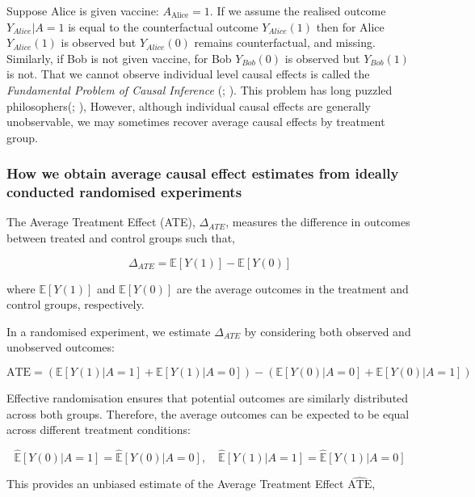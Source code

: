 \documentclass[
  single column]{article}
\begin{document}
Suppose Alice is given vaccine: \(A_{\text{Alice}} = 1\). If we assume
the realised outcome \(Y_{Alice}| A = 1\) is equal to the counterfactual
outcome \(Y_{Alice}(1)\) then for Alice \(Y_{Alice}(1)\) is observed but
\(Y_{Alice}(0)\) remains counterfactual, and missing. Similarly, if Bob
is not given vaccine, for Bob \(Y_{Bob}(0)\) is observed but
\(Y_{Bob}(1)\) is not. That we cannot observe individual level causal
effects is called the \emph{Fundamental Problem of Causal Inference}
(;
). This problem has long puzzled
philosophers(;
), However, although individual
causal effects are generally unobservable, we may sometimes recover
average causal effects by treatment group.

\subsubsection{How we obtain average causal effect estimates from
ideally conducted randomised
experiments}\label{how-we-obtain-average-causal-effect-estimates-from-ideally-conducted-randomised-experiments}

The Average Treatment Effect (ATE), \(\Delta_{ATE}\), measures the
difference in outcomes between treated and control groups such that,

\[
\Delta_{ATE} = \mathbb{E}[Y(1)] - \mathbb{E}[Y(0)]
\]

where \(\mathbb{E}[Y(1)]\) and \(\mathbb{E}[Y(0)]\) are the average
outcomes in the treatment and control groups, respectively.

In a randomised experiment, we estimate \(\Delta_{ATE}\) by considering
both observed and unobserved outcomes:

\[
\text{ATE} = \left(\mathbb{E}[Y(1)|A = 1] + \mathbb{E}[Y(1)|A = 0]\right) - \left(\mathbb{E}[Y(0)|A = 0] + \mathbb{E}[Y(0)|A = 1]\right)
\]

Effective randomisation ensures that potential outcomes are similarly
distributed across both groups. Therefore, the average outcomes can be
expected to be equal across different treatment conditions:

\[
\widehat{\mathbb{E}}[Y(0) | A = 1] = \widehat{\mathbb{E}}[Y(0) | A = 0], \quad \widehat{\mathbb{E}}[Y(1) | A = 1] = \widehat{\mathbb{E}}[Y(1) | A = 0]
\]

This provides an unbiased estimate of the Average Treatment Effect
\(\widehat{\text{ATE}}\),
\end{document}
